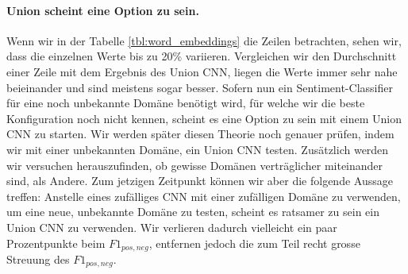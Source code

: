 \paragraph{Union scheint eine Option zu sein.} Wenn wir in der Tabelle \ref{tbl:word_embeddings} die Zeilen betrachten, sehen wir, dass die einzelnen Werte bis zu 20\% variieren. Vergleichen wir den Durchschnitt einer Zeile mit dem Ergebnis des Union CNN, liegen die Werte immer sehr nahe beieinander und sind meistens sogar besser. Sofern nun ein Sentiment-Classifier für eine noch unbekannte Domäne benötigt wird, für welche wir die beste Konfiguration noch nicht kennen, scheint es eine  Option zu sein mit einem Union CNN zu starten. Wir werden später diesen Theorie noch genauer prüfen, indem wir mit einer unbekannten Domäne, ein Union CNN testen. Zusätzlich werden wir versuchen herauszufinden, ob gewisse Domänen verträglicher miteinander sind, als Andere. Zum jetzigen Zeitpunkt können wir aber die folgende Aussage treffen: Anstelle eines zufälliges CNN mit einer zufälligen Domäne zu verwenden, um eine neue, unbekannte Domäne zu testen, scheint es ratsamer zu sein ein Union CNN zu verwenden. Wir verlieren dadurch vielleicht ein paar Prozentpunkte beim $F1_{pos,neg}$, entfernen jedoch die zum Teil recht grosse Streuung des $F1_{pos,neg}$.
